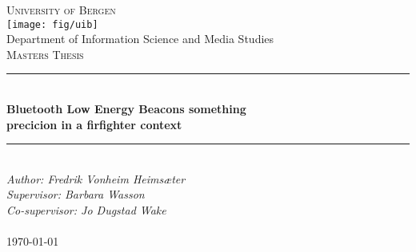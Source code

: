 \documentclass[../Main/thesis.tex]{subfiles}
\begin{document}

\newcommand{\HRule}{\rule{\linewidth}{0.5mm}}

\begin{titlepage}
\begin{center}
\textsc{\Huge University of Bergen}\\[0.4cm]
\texttt{[image: fig/uib]} \\[0.5cm]

\large Department of Information Science and Media Studies\\[0.7cm]
\textsc{\huge Masters Thesis}\\[0.4cm]
\HRule \\[0.4cm]
{ \huge \bfseries Bluetooth Low Energy Beacons something \\precicion in a firfighter context}\\[0.5cm]
\HRule \\[1.0cm]

\emph{Author: Fredrik Vonheim Heimsæter}\\
\emph{Supervisor: Barbara Wasson}\\
\emph{Co-supervisor: Jo Dugstad Wake}\\

\paragraph*{}
\end{center}
\vfill
\begin{center}
{\large \today}
\end{center}
\end{titlepage}
\end{document}
